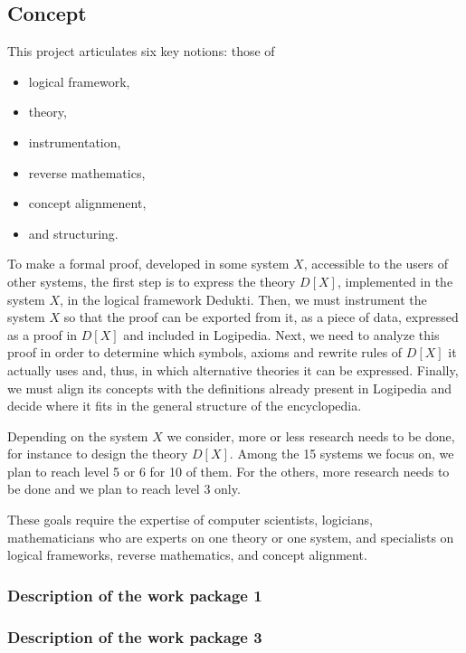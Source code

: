 \subsection{Concept}

This project articulates six key notions: those of 
\begin{itemize}
\item logical framework,
\item theory,
\item instrumentation,
\item reverse mathematics,
\item concept alignmenent,
\item and structuring.
\end{itemize}

To make a formal proof, developed in some system $X$, accessible to
the users of other systems, the first step is to express the theory
$D[X]$, implemented in the system $X$, in the logical framework {\sc
  Dedukti}.  Then, we must instrument the system $X$ so that the proof
can be exported from it, as a piece of data, expressed as a proof in
$D[X]$ and included in {\sc Logipedia}. Next, we need to analyze this
proof in order to determine which symbols, axioms and rewrite rules of
$D[X]$ it actually uses and, thus, in which alternative theories it
can be expressed.  Finally, we must align its concepts with the
definitions already present in {\sc Logipedia} and decide where it
fits in the general structure of the encyclopedia.

Depending on the system $X$ we consider, more or less research needs
to be done, for instance to design the theory $D[X]$. Among the 15
systems we focus on, we plan to reach level 5 or 6 for 10 of them.
For the others, more research needs to be done and we plan to reach
level 3 only.

These goals require the expertise of computer scientists, logicians,
mathematicians who are experts on one theory or one system, and
specialists on logical frameworks, reverse mathematics, and concept
alignment.

\subsubsection{Description of the work package 1}

\subsubsection{Description of the work package 3}

